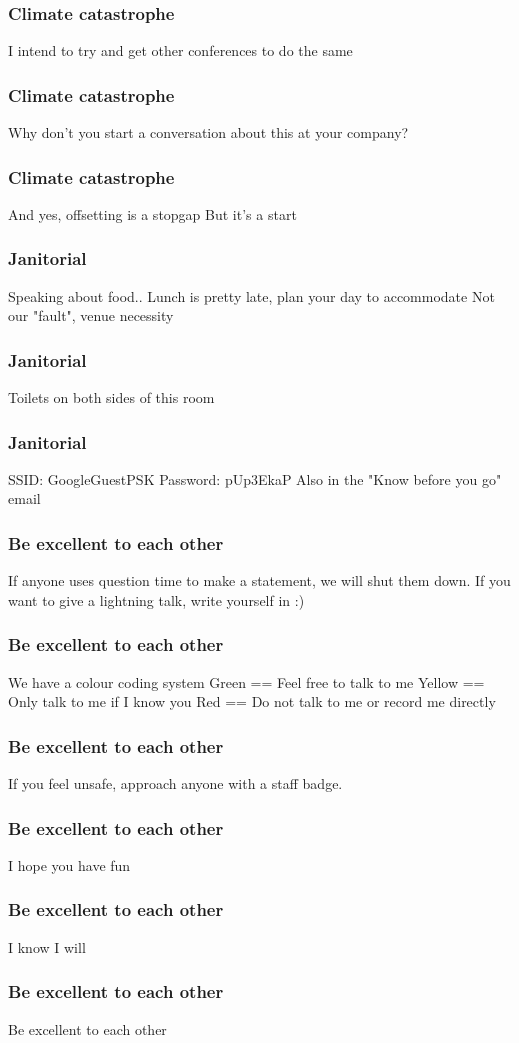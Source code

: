 \documentclass[aspectratio=169]{beamer}
\begin{document}
\begin{frame}
	\frametitle{Climate catastrophe}
	\centering
	\vfill
	I intend to try and get other conferences to do the same
	\vfill
\end{frame}

\begin{frame}
	\frametitle{Climate catastrophe}
	\centering
	\vfill
	Why don't you start a conversation about this at your company?
	\vfill
\end{frame}

\begin{frame}
	\frametitle{Climate catastrophe}
	\centering
	\vfill
	And yes, offsetting is a stopgap
	\vfill
	But it's a start
	\vfill
\end{frame}

\begin{frame}
	\frametitle{Janitorial}
	\centering
	\vfill
	Speaking about food..
	\vfill
	Lunch is pretty late, plan your day to accommodate
	\vfill
	Not our "fault", venue necessity
	\vfill
\end{frame}

\begin{frame}
	\frametitle{Janitorial}
	\centering
	\vfill
	Toilets on both sides of this room
	\vfill
\end{frame}

\begin{frame}
	\frametitle{Janitorial}
	\centering
	\vfill
	SSID: GoogleGuestPSK
	\vfill
	Password: pUp3EkaP
	\vfill
	Also in the "Know before you go" email
	\vfill
\end{frame}

\begin{frame}
	\frametitle{Be excellent to each other}
	\centering
	\vfill
	If anyone uses question time to make a statement, we will shut them down.
	\vfill
	If you want to give a lightning talk, write yourself in :)
	\vfill
\end{frame}

\begin{frame}
	\frametitle{Be excellent to each other}
	\centering
	\vfill
	We have a colour coding system
	\vfill
	Green == Feel free to talk to me
	\vfill
	Yellow == Only talk to me if I know you
	\vfill
	Red == Do not talk to me or record me directly
	\vfill
\end{frame}

\begin{frame}
	\frametitle{Be excellent to each other}
	\centering
	\vfill
	If you feel unsafe, approach anyone with a staff badge.
	\vfill
\end{frame}

\begin{frame}
	\frametitle{Be excellent to each other}
	\centering
	\vfill
	I hope you have fun
	\vfill
\end{frame}

\begin{frame}
	\frametitle{Be excellent to each other}
	\centering
	\vfill
	I know I will
	\vfill
\end{frame}

\begin{frame}
	\frametitle{Be excellent to each other}
	\centering
	\vfill
	Be excellent to each other
	\vfill
\end{frame}
\end{document}

